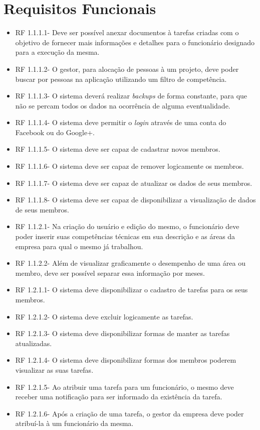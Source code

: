 \section{Requisitos Funcionais}
\begin{itemize}
\item RF 1.1.1.1- Deve ser possível anexar documentos à tarefas criadas com o objetivo de fornecer mais informações e detalhes para o funcionário designado para a execução da mesma.
\item RF 1.1.1.2- O gestor, para alocação de pessoas à um projeto, deve poder buscar por pessoas na aplicação utilizando um filtro de competência.
\item RF 1.1.1.3- O sistema deverá realizar \textit{backups} de forma constante, para que não se percam todos os dados na ocorrência de alguma eventualidade.
\item RF 1.1.1.4- O sistema deve permitir o \textit{login} através de uma conta do Facebook ou do Google+.
\item RF 1.1.1.5- O sistema deve ser capaz de cadastrar novos membros.
\item RF 1.1.1.6- O sistema deve ser capaz de remover logicamente os membros.
\item RF 1.1.1.7- O sistema deve ser capaz de atualizar os dados de seus membros.
\item RF 1.1.1.8- O sistema deve ser capaz de disponibilizar a visualização de dados de seus membros.
\item RF 1.1.2.1- Na criação do usuário e edição do mesmo, o funcionário deve poder inserir suas competências técnicas em sua descrição e as áreas da empresa para qual o mesmo já trabalhou.
\item RF 1.1.2.2- Além de visualizar graficamente o desempenho de uma área ou membro, deve ser possível separar essa informação por meses.
\item RF 1.2.1.1- O sistema deve disponibilizar o cadastro de tarefas para os seus membros.
\item RF 1.2.1.2- O sistema deve excluir logicamente as tarefas.
\item RF 1.2.1.3- O sistema deve disponibilizar formas de manter as tarefas atualizadas.
\item RF 1.2.1.4- O sistema deve disponibilizar formas dos membros poderem visualizar as suas tarefas.
\item RF 1.2.1.5- Ao atribuir uma tarefa para um funcionário, o mesmo deve receber uma notificação para ser informado da existência da tarefa.
\item RF 1.2.1.6- Após a criação de uma tarefa, o gestor da empresa deve poder atribuí-la à um funcionário da mesma.

\end{itemize}
